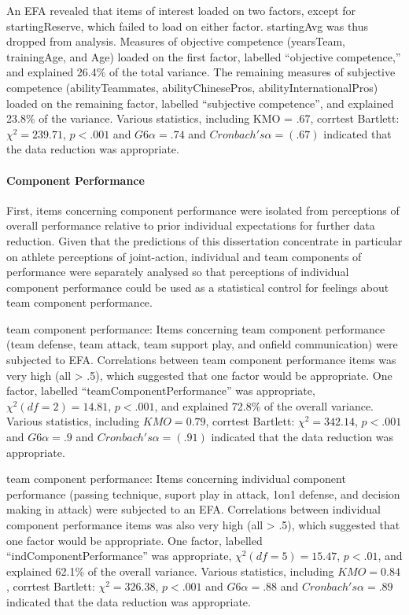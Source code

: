 \documentclass[12pt]{report}
\begin{document}
An EFA revealed that items of interest loaded on two factors, except for startingReserve, which failed to load on either factor.  startingAvg was thus dropped from analysis.  Measures of objective competence (yearsTeam, trainingAge, and Age) loaded on the first factor, labelled ``objective competence,'' and explained 26.4\% of the total variance. The remaining measures of subjective competence (abilityTeammates, abilityChinesePros, abilityInternationalPros) loaded on the remaining factor, labelled ``subjective competence'', and explained 23.8\% of the variance.   Various statistics, including KMO = .67, corrtest Bartlett: $\chi^2 = 239.71$, $p < .001$ and $G6\alpha =.74$ and $Cronbach's \alpha = (.67)$ indicated that the data reduction was appropriate.

\paragraph{Component Performance}

First, items concerning component performance were isolated from perceptions of overall performance relative to prior individual expectations for further data reduction.
Given that the predictions of this dissertation concentrate in particular on athlete  perceptions of joint-action, individual and team components of performance were separately analysed so that perceptions of individual component performance could be used as a statistical control for feelings about team component performance.

team component performance:
Items concerning team component performance (team defense, team attack, team support play, and onfield communication) were subjected to EFA.  Correlations between team component performance items was very high (all > .5), which suggested that one factor would be appropriate.  One factor, labelled ``teamComponentPerformance'' was appropriate, $\chi^2 (df=2) = 14.81$, $p < .001$, and explained 72.8\% of the overall variance.  Various statistics, including $KMO = 0.79$, corrtest Bartlett: $\chi^2 = 342.14$, $p < .001$ and $G6\alpha =.9$ and $Cronbach's \alpha = (.91)$ indicated that the data reduction was appropriate.

team component performance:
Items concerning individual component performance (passing technique, suport play in attack, 1on1 defense, and decision making in attack) were subjected to an EFA.  Correlations between individual component performance items was also very high (all > .5), which suggested that one factor would be appropriate.  One factor, labelled ``indComponentPerformance'' was appropriate, $\chi^2 (df=5) = 15.47$, $p < .01$, and explained 62.1\% of the overall variance.  Various statistics, including $KMO =  0.84$, corrtest Bartlett: $\chi^2 =  326.38$, $p < .001$ and $G6\alpha =.88$ and $Cronbach's \alpha = .89$ indicated that the data reduction was appropriate.
\end{document}
